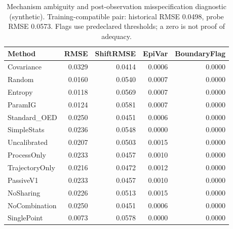 \begin{table}[t]
\caption{Mechanism ambiguity and post-observation misspecification diagnostic (synthetic). Training-compatible pair: historical RMSE 0.0498, probe RMSE 0.0573. Flags use predeclared thresholds; a zero is not proof of adequacy.}
\label{tab:experiment1}
\begin{tabular}{lrrrr}
\toprule
Method & RMSE & ShiftRMSE & EpiVar & BoundaryFlag \\
\midrule
Covariance & 0.0329 & 0.0414 & 0.0006 & 0.0000 \\
Random & 0.0160 & 0.0540 & 0.0007 & 0.0000 \\
Entropy & 0.0118 & 0.0569 & 0.0007 & 0.0000 \\
ParamIG & 0.0124 & 0.0581 & 0.0007 & 0.0000 \\
Standard\_OED & 0.0250 & 0.0451 & 0.0006 & 0.0000 \\
SimpleStats & 0.0236 & 0.0548 & 0.0000 & 0.0000 \\
Uncalibrated & 0.0207 & 0.0503 & 0.0015 & 0.0000 \\
ProcessOnly & 0.0233 & 0.0457 & 0.0010 & 0.0000 \\
TrajectoryOnly & 0.0216 & 0.0472 & 0.0012 & 0.0000 \\
PassiveV1 & 0.0233 & 0.0457 & 0.0010 & 0.0000 \\
NoSharing & 0.0226 & 0.0513 & 0.0015 & 0.0000 \\
NoCombination & 0.0250 & 0.0451 & 0.0006 & 0.0000 \\
SinglePoint & 0.0073 & 0.0578 & 0.0000 & 0.0000 \\
\bottomrule
\end{tabular}
\end{table}
